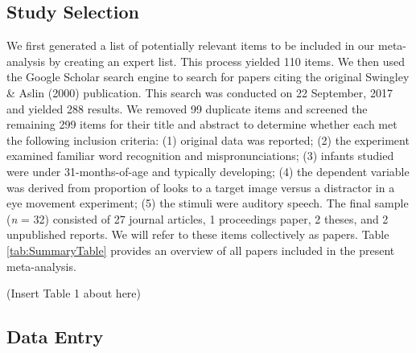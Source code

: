 \documentclass[
  man, noextraspace]{apa6}
\begin{document}
\hypertarget{study-selection}{%
\subsection{Study Selection}\label{study-selection}}

We first generated a list of potentially relevant items to be included in our meta-analysis by creating an expert list. This process yielded 110 items. We then used the Google Scholar search engine to search for papers citing the original Swingley \& Aslin (2000) publication. This search was conducted on 22 September, 2017 and yielded 288 results. We removed 99 duplicate items and screened the remaining 299 items for their title and abstract to determine whether each met the following inclusion criteria: (1) original data was reported; (2) the experiment examined familiar word recognition and mispronunciations; (3) infants studied were under 31-months-of-age and typically developing; (4) the dependent variable was derived from proportion of looks to a target image versus a distractor in a eye movement experiment; (5) the stimuli were auditory speech. The final sample (\emph{n} = 32) consisted of 27 journal articles, 1 proceedings paper, 2 theses, and 2 unpublished reports. We will refer to these items collectively as papers. Table \ref{tab:SummaryTable} provides an overview of all papers included in the present meta-analysis.

(Insert Table 1 about here)

\hypertarget{data-entry}{%
\subsection{Data Entry}\label{data-entry}}
\end{document}
